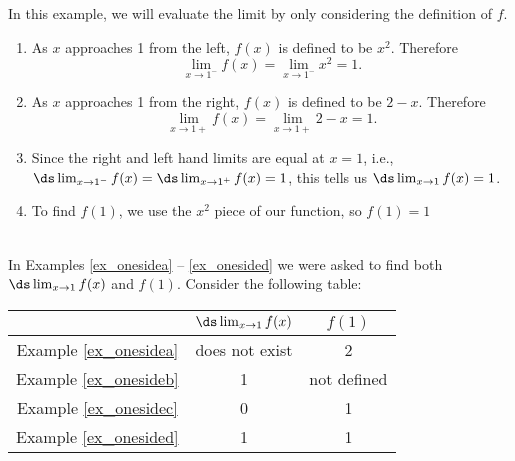 {In this example, we will evaluate the limit by only considering the definition of $f$.
\begin{enumerate}
	\item	As $x$ approaches 1 from the left, $f(x)$ is defined to be $x^2$. Therefore \[\lim_{x\to1^-} f(x)=\lim_{x\to1^-} x^2=1.\]
	\item	As $x$ approaches 1 from the right, $f(x)$ is defined to be $2-x$. Therefore \[\lim_{x\to 1+} f(x)=\lim_{x\to 1+} 2-x=1.\]
	\item	Since the right and left hand limits are equal at $x=1$, i.e., $\ds \lim_{x\to1^-} f(x)=\ds \lim_{x\to1^+} f(x)=1$, this tells us $\ds \lim_{x\to1} f(x)=1$.
	\item	To find $f(1)$, we use the $x^2$ piece of our function, so $f(1)=1$ 		
\end{enumerate}
}\\

In Examples \ref{ex_onesidea} -- \ref{ex_onesided} we were asked to find both $\ds \lim_{x\to 1}f(x)$ and $f(1)$. Consider the following table:
\begin{center}
\begin{tabular}{ccc} & $\ds \lim_{x\to 1}f(x)$ & $f(1)$ \vspace{2pt}\\ \hline
Example \ref{ex_onesidea} & does not exist & 2 \\
Example \ref{ex_onesideb} & 1 & not defined \\
Example \ref{ex_onesidec} & 0 & 1 \\
Example \ref{ex_onesided} & 1 & 1 \\
\end{tabular}
\end{center}


